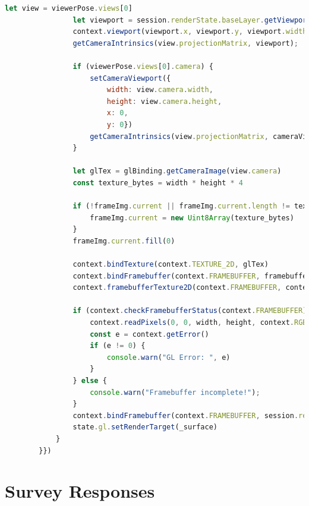 \documentclass[thesis]{fputhesis}
\begin{document}
\begin{body}
\begin{appendices}
\begin{lstlisting}[language=Javascript]
                let view = viewerPose.views[0]
                let viewport = session.renderState.baseLayer.getViewport(view)
                context.viewport(viewport.x, viewport.y, viewport.width, viewport.height);
                getCameraIntrinsics(view.projectionMatrix, viewport);
                
                if (viewerPose.views[0].camera) {
                    setCameraViewport({
                        width: view.camera.width,
                        height: view.camera.height,
                        x: 0,
                        y: 0})
                    getCameraIntrinsics(view.projectionMatrix, cameraViewport);
                }

                let glTex = glBinding.getCameraImage(view.camera)
                const texture_bytes = width * height * 4
                
                if (!frameImg.current || frameImg.current.length != texture_bytes) {
                    frameImg.current = new Uint8Array(texture_bytes)
                }
                frameImg.current.fill(0)

                context.bindTexture(context.TEXTURE_2D, glTex)
                context.bindFramebuffer(context.FRAMEBUFFER, framebuffer.current)
                context.framebufferTexture2D(context.FRAMEBUFFER, context.COLOR_ATTACHMENT0, context.TEXTURE_2D, glTex, 0);
                
                if (context.checkFramebufferStatus(context.FRAMEBUFFER) == context.FRAMEBUFFER_COMPLETE) {
                    context.readPixels(0, 0, width, height, context.RGBA, context.UNSIGNED_BYTE, frameImg.current)
                    const e = context.getError()
                    if (e != 0) {
                        console.warn("GL Error: ", e)
                    }
                } else {
                    console.warn("Framebuffer incomplete!");
                }
                context.bindFramebuffer(context.FRAMEBUFFER, session.renderState.baseLayer.framebuffer)
                state.gl.setRenderTarget(_surface)
            }
        }})
\end{lstlisting}

\chapter{Survey Responses}

\end{appendices}
\end{body}
\end{document}
